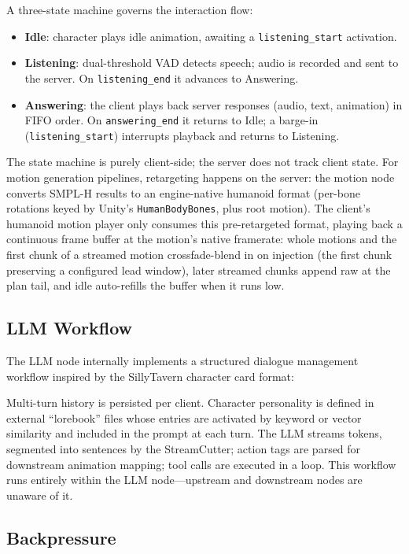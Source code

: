 \documentclass[11pt,a4paper]{article}
\begin{document}
A three-state machine governs the interaction flow:
\begin{itemize}[nosep]
    \item \textbf{Idle}: character plays idle animation, awaiting a \texttt{listening\_start} activation.
    \item \textbf{Listening}: dual-threshold VAD detects speech; audio is recorded and sent to the server. On \texttt{listening\_end} it advances to Answering.
    \item \textbf{Answering}: the client plays back server responses (audio, text, animation) in FIFO order. On \texttt{answering\_end} it returns to Idle; a barge-in (\texttt{listening\_start}) interrupts playback and returns to Listening.
\end{itemize}

The state machine is purely client-side; the server does not track client state. For motion generation pipelines, retargeting happens on the server: the motion node converts SMPL-H results to an engine-native humanoid format (per-bone rotations keyed by Unity's \texttt{HumanBodyBones}, plus root motion). The client's humanoid motion player only consumes this pre-retargeted format, playing back a continuous frame buffer at the motion's native framerate: whole motions and the first chunk of a streamed motion crossfade-blend in on injection (the first chunk preserving a configured lead window), later streamed chunks append raw at the plan tail, and idle auto-refills the buffer when it runs low.

\subsection{LLM Workflow}

The LLM node internally implements a structured dialogue management workflow inspired by the SillyTavern character card format:

Multi-turn history is persisted per client. Character personality is defined in external ``lorebook'' files whose entries are activated by keyword or vector similarity and included in the prompt at each turn. The LLM streams tokens, segmented into sentences by the StreamCutter; action tags are parsed for downstream animation mapping; tool calls are executed in a loop. This workflow runs entirely within the LLM node---upstream and downstream nodes are unaware of it.

\subsection{Backpressure}
\end{document}
